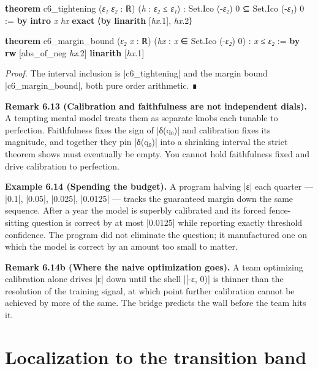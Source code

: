 \documentclass{memoir}
\begin{document}
\begin{LeanVerbatim}
\textbf{theorem} c6_tightening (\textit{ε₁} \textit{ε₂} : ℝ) (\textit{h} : \textit{ε₂} ≤ \textit{ε₁}) :
    Set.Ico (-\textit{ε₂}) 0 ⊆ Set.Ico (-\textit{ε₁}) 0 := \textbf{by}
  \textbf{intro} \textit{x} \textit{hx}
  \textbf{exact} ⟨\textbf{by} \textbf{linarith} [\textit{hx}.1], \textit{hx}.2⟩

\textbf{theorem} c6_margin_bound (\textit{ε₂} \textit{x} : ℝ)
    (\textit{hx} : \textit{x} ∈ Set.Ico (-\textit{ε₂}) 0) :
    \textit{x} ≤ \textit{ε₂} := \textbf{by}
  \textbf{rw} [abs_of_neg \textit{hx}.2]
  \textbf{linarith} [\textit{hx}.1]

\end{LeanVerbatim}


\emph{Proof.} The interval inclusion is \LeanVerb|c6_tightening| and the margin bound
\LeanVerb|c6_margin_bound|, both pure order arithmetic. ∎

\textbf{Remark 6.13 (Calibration and faithfulness are not independent dials).} A tempting
mental model treats them as separate knobs each tunable to perfection.
Faithfulness fixes the sign of \LeanVerb|δ(q₀)| and calibration fixes its magnitude, and
together they pin \LeanVerb|δ(q₀)| into a shrinking interval the strict theorem shows
must eventually be empty. You cannot hold faithfulness fixed and drive
calibration to perfection.

\textbf{Example 6.14 (Spending the budget).} A program halving \LeanVerb|ε| each quarter — \LeanVerb|0.1|,
\LeanVerb|0.05|, \LeanVerb|0.025|, \LeanVerb|0.0125| — tracks the guaranteed margin down the same sequence.
After a year the model is superbly calibrated and its forced fence-sitting
question is correct by at most \LeanVerb|0.0125| while reporting exactly threshold
confidence. The program did not eliminate the question; it manufactured one on
which the model is correct by an amount too small to matter.

\textbf{Remark 6.14b (Where the naive optimization goes).} A team optimizing calibration
alone drives \LeanVerb|ε| down until the shell \LeanVerb|[-ε, 0)| is thinner than the resolution
of the training signal, at which point further calibration cannot be achieved by
more of the same. The bridge predicts the wall before the team hits it.



\section{Localization to the transition band}\label{Two--Schemas--of--Impossibility-005F-005F-005F--Machine--Checked--Limits--of--Trustworthy--Machine--Learning-005F-005F-005F--and--Why--They--Tighten--with--Capability----Approximate--Bridges--to--Real--Models----Localization--to--the--transition--band}
\end{document}
